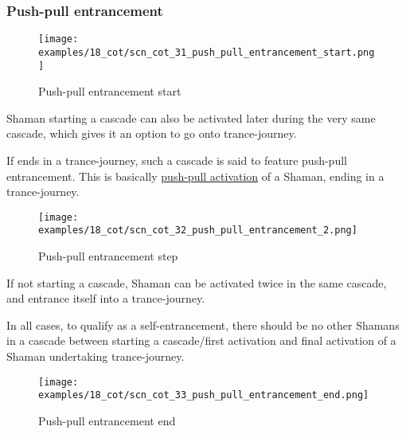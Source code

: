 \clearpage %

\subsubsection*{Push-pull entrancement}

\noindent
\begin{wrapfigure}[9]{l}{0.4\textwidth}
\centering
\texttt{[image: examples/18\_cot/scn\_cot\_31\_push\_pull\_entrancement\_start.png]}
\caption{Push-pull entrancement start}
\label{fig:star/scn_cot_31_push_pull_entrancement_start}
\end{wrapfigure}
Shaman starting a cascade can also be activated later during the very same cascade, which gives it an
option to go onto trance-journey.

If ends in a trance-journey, such a cascade is said to feature push-pull entrancement. This is basically
\hyperref[txt:Miranda's veil/Cascading Waves/Push-pull activation]{push-pull activation} of a Shaman,
ending in a trance-journey.

\vspace*{0.05\textheight}
\noindent
\begin{wrapfigure}[11]{l}{0.4\textwidth}
\centering
\texttt{[image: examples/18\_cot/scn\_cot\_32\_push\_pull\_entrancement\_2.png]}
\caption{Push-pull entrancement step}
\label{fig:star/scn_cot_32_push_pull_entrancement_2}
\end{wrapfigure}
If not starting a cascade, Shaman can be activated twice in the same cascade, and entrance itself
into a trance-journey.

In all cases, to qualify as a self-entrancement, there should be no other Shamans in a cascade
between starting a cascade/first activation and final activation of a Shaman undertaking
trance-journey.

\clearpage %

\noindent
\begin{figure}[!h]
\texttt{[image: examples/18\_cot/scn\_cot\_33\_push\_pull\_entrancement\_end.png]}
\caption{Push-pull entrancement end}
\label{fig:scn_cot_33_push_pull_entrancement_end}
\end{figure}

